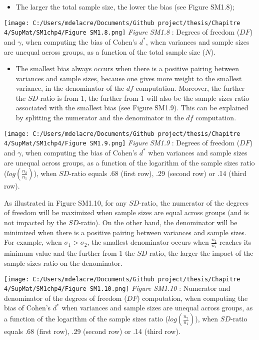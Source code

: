 \documentclass[
  english,
  man,mask,floatsintext]{apa6}
\providecommand{\tightlist}{%
  \setlength{\itemsep}{0pt}\setlength{\parskip}{0pt}}
\begin{document}
\newpage

\begin{itemize}
\tightlist
\item
  The larger the total sample size, the lower the bias (see Figure SM1.8);
\end{itemize}

\texttt{[image: C:/Users/mdelacre/Documents/Github project/thesis/Chapitre 4/SupMat/SM1chp4/Figure SM1.8.png]}
\emph{Figure SM1.8} : Degrees of freedom (\(DF\)) and \(\gamma\), when computing the bias of Cohen's \(d^*\), when variances and sample sizes are unequal across groups, as a function of the total sample size (\(N\)).
\newpage

\begin{itemize}
\tightlist
\item
  The smallest bias always occurs when there is a positive pairing between variances and sample sizes, because one gives more weight to the smallest variance, in the denominator of the \(df\) computation. Moreover, the further the \(SD\)-ratio is from 1, the further from 1 will also be the sample sizes ratio associated with the smallest bias (see Figure SM1.9). This can be explained by splitting the numerator and the denominator in the \(df\) computation.
\end{itemize}

\texttt{[image: C:/Users/mdelacre/Documents/Github project/thesis/Chapitre 4/SupMat/SM1chp4/Figure SM1.9.png]}
\emph{Figure SM1.9} : Degrees of freedom (\(DF\)) and \(\gamma\), when computing the bias of Cohen's \(d^*\) when variances and sample sizes are unequal across groups, as a function of the logarithm of the sample sizes ratio (\(log \left( \frac{n_2}{n_1} \right)\)), when \(SD\)-ratio equals .68 (first row), .29 (second row) or .14 (third row).

\newpage

As illustrated in Figure SM1.10, for any \(SD\)-ratio, the numerator of the degrees of freedom will be maximized when sample sizes are equal across groups (and is not impacted by the \(SD\)-ratio). On the other hand, the denominator will be minimized when there is a positive pairing between variances and sample sizes. For example, when \(\sigma_1 > \sigma_2\), the smallest denominator occurs when \(\frac{n_2}{n_1}\) reaches its minimum value and the further from 1 the \(SD\)-ratio, the larger the impact of the sample sizes ratio on the denominator.

\texttt{[image: C:/Users/mdelacre/Documents/Github project/thesis/Chapitre 4/SupMat/SM1chp4/Figure SM1.10.png]}
\emph{Figure SM1.10} : Numerator and denominator of the degrees of freedom (\(DF\)) computation, when computing the bias of Cohen's \(d^*\) when variances and sample sizes are unequal across groups, as a function of the logarithm of the sample sizes ratio (\(log \left( \frac{n_2}{n_1} \right)\)), when \(SD\)-ratio equals .68 (first row), .29 (second row) or .14 (third row).
\end{document}
